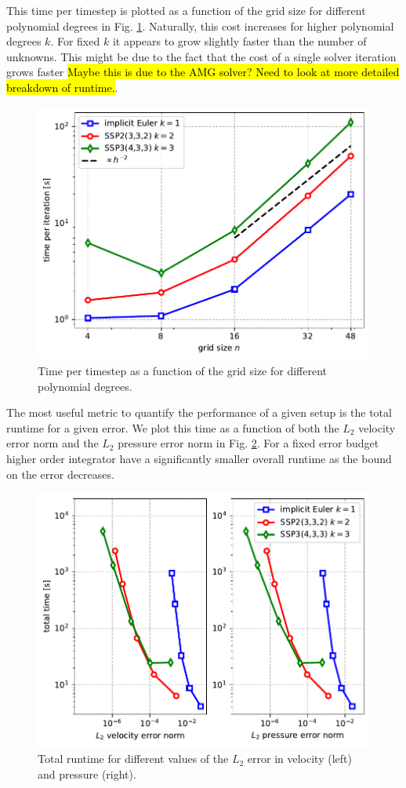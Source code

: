 \documentclass[11pt]{article}
\begin{document}
This time per timestep is plotted as a function of the grid size for different polynomial degrees in Fig. \ref{fig:titer}. Naturally, this cost increases for higher polynomial degrees $k$. For fixed $k$ it appears to grow slightly faster than the number of unknowns. This might be due to the fact that the cost of a single solver iteration grows faster \hl{Maybe this is due to the AMG solver? Need to look at more detailed breakdown of runtime.}.
\begin{figure}
    \begin{center}
        \includegraphics[width=0.75\linewidth]{figures/titer.pdf}
        \caption{Time per timestep as a function of the grid size for different polynomial degrees.}
        \label{fig:titer}
    \end{center}
\end{figure}
The most useful metric to quantify the performance of a given setup is the total runtime for a given error. We plot this time as a function of both the $L_2$ velocity error norm and the $L_2$ pressure error norm in Fig. \ref{fig:ttotal}. For a fixed error budget higher order integrator have a significantly smaller overall runtime as the bound on the error decreases.
\begin{figure}
    \begin{center}
        \includegraphics[width=0.75\linewidth]{figures/ttotal.pdf}
        \caption{Total runtime for different values of the $L_2$ error in velocity (left) and pressure (right).}
        \label{fig:ttotal}
    \end{center}
\end{figure}
\clearpage
\appendix
\end{document}
